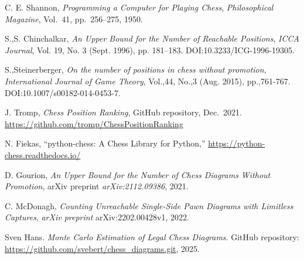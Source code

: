 \documentclass[12pt]{article}
\begin{document}
\begin{thebibliography}{9}

C. E. Shannon, \emph{Programming a Computer for Playing Chess}, 
\textit{Philosophical Magazine}, Vol.~41, pp.~256–275, 1950.

S.,S. Chinchalkar, \emph{An Upper Bound for the Number of Reachable Positions},
\textit{ICCA Journal}, Vol. 19, No. 3 (Sept. 1996), pp. 181–183. DOI:10.3233/ICG-1996-19305.

S.,Steinerberger, \emph{On the number of positions in chess without promotion},
\textit{International Journal of Game Theory}, Vol.,44, No.,3 (Aug. 2015), pp.,761-767. DOI:10.1007/s00182-014-0453-7. 

J. Tromp, \emph{Chess Position Ranking}, GitHub repository, Dec.~2021. 
\url{https://github.com/tromp/ChessPositionRanking}

N. Fiekas, “python-chess: A Chess Library for Python,” 
\url{https://python-chess.readthedocs.io/}

D. Gourion, \emph{An Upper Bound for the Number of Chess Diagrams Without Promotion}, 
arXiv preprint \textit{arXiv:2112.09386}, 2021.

C. McDonagh, \emph{Counting Unreachable Single-Side Pawn Diagrams with Limitless Captures}, 
\textit{arXiv preprint} arXiv:2202.00428v1, 2022.

Sven Hans. \emph{Monte Carlo Estimation of Legal Chess Diagrams}.
GitHub repository: \url{https://github.com/svebert/chess_diagrams.git}, 2025.

\end{thebibliography}
\end{document}
